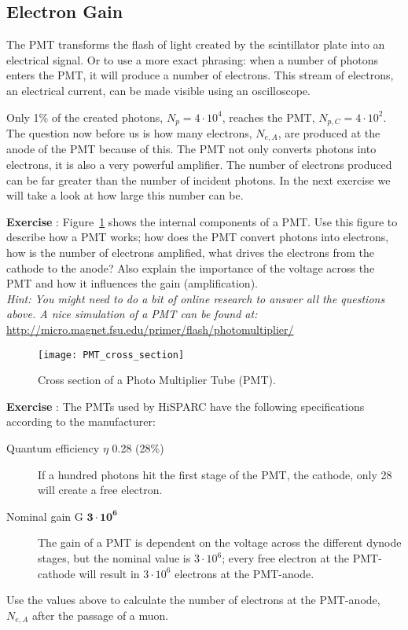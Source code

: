 \subsection{Electron Gain}
The PMT transforms the flash of light created by the scintillator plate into an electrical signal. Or to use a more exact phrasing: when a number of photons enters the PMT, it will produce a number of electrons. This stream of electrons, an electrical current, can be made visible using an oscilloscope.

Only 1\% of the created photons, $N_p=4 \cdot 10^4$, reaches the PMT, $N_{p,C}=4 \cdot 10^2$. The question now before us is how many electrons, $N_{e,A}$, are produced at the anode of the PMT because of this. The PMT not only converts photons into electrons, it is also a very powerful amplifier. The number of electrons produced can be far greater than the number of incident photons. In the next exercise we will take a look at how large this number can be.

\begin{shaded}
\textbf{Exercise \theExercise {}} : Figure~\ref{fig:PMT_cross_section} shows the internal components of a PMT. Use this figure to describe how a PMT works; how does the PMT convert photons into electrons, how is the number of electrons amplified, what drives the electrons from the cathode to the anode? Also explain the importance of the voltage across the PMT and how it influences the gain (amplification).\\
\emph{Hint: You might need to do a bit of online research to answer all the questions above. A nice simulation of a PMT can be found at:\\}
\url{http://micro.magnet.fsu.edu/primer/flash/photomultiplier/}
\end{shaded}

\begin{figure}\begin{center}
\texttt{[image: PMT\_cross\_section]}%
\caption{Cross section of a Photo Multiplier Tube (PMT).}\label{fig:PMT_cross_section}
\end{center}\end{figure}

\begin{shaded}
\textbf{Exercise \theExercise {}} : The PMTs used by HiSPARC have the following specifications according to the manufacturer:
\begin{description}
\item [Quantum efficiency $\eta$ 0.28 (28\%)] If a hundred photons hit the first stage of the PMT, the cathode, only 28 will create a free electron.
\item [Nominal gain G $ \mathbf{3 \cdot 10^6}$] The gain of a PMT is dependent on the voltage across the different dynode stages, but the nominal value is $3 \cdot 10^6$; every free electron at the PMT-cathode will result in $3 \cdot 10^6$ electrons at the PMT-anode.
\end{description}
Use the values above to calculate the number of electrons at the PMT-anode, $N_{e,A}$ after the passage of a muon.
\end{shaded}

